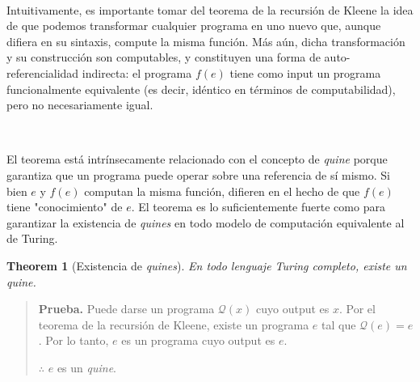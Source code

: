 \documentclass[a4paper, 12pt]{article}
\newtheorem{theorem}{Theorem}
\newtheorem{theorem}{Theorem}
\begin{document}
~

Intuitivamente, es importante tomar del teorema de la recursión de
Kleene la idea de que podemos transformar cualquier programa en uno nuevo que,
aunque difiera en su sintaxis, compute la misma función. Más aún, dicha
transformación y su construcción son computables, y constituyen una forma de
auto-referencialidad indirecta: el programa $f(e)$ tiene como input un programa
funcionalmente equivalente (es decir, idéntico en términos de computabilidad),
pero no necesariamente igual.

~
~

El teorema está intrínsecamente relacionado con el concepto de \textit{quine}
porque garantiza que un programa puede operar sobre una referencia de sí mismo.
Si bien $e$ y $f(e)$ computan la misma función, difieren en el hecho de que
$f(e)$ tiene "conocimiento" de $e$. El teorema es lo suficientemente fuerte como
para garantizar la existencia de \textit{quines} en todo modelo de computación
equivalente al de Turing. 

\begin{theorem}[Existencia de \textit{quines}]
  En todo lenguaje Turing completo, existe un quine.
\end{theorem}


\small
\begin{quote}

\textbf{Prueba.} Puede darse un programa $\mathcal{Q}(x)$ cuyo output es $x$. Por
el teorema de la recursión de Kleene, existe un programa $e$ tal que
$\mathcal{Q}(e) = e$. Por lo tanto, $e$ es un programa cuyo output es $e$.

$\therefore $ $e$ es un \textit{quine}.

\end{quote}
\normalsize
\end{document}
